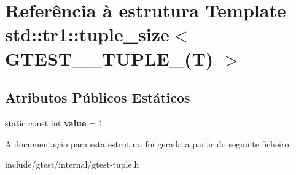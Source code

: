 \hypertarget{structstd_1_1tr1_1_1tuple__size_3_01GTEST__1__TUPLE___07T_08_01_4}{\section{Referência à estrutura Template std\-:\-:tr1\-:\-:tuple\-\_\-size$<$ G\-T\-E\-S\-T\-\_\-\_\-\-T\-U\-P\-L\-E\-\_\-(T) $>$}
\label{structstd_1_1tr1_1_1tuple__size_3_01GTEST__1__TUPLE___07T_08_01_4}
}
\subsection*{Atributos Públicos Estáticos}
\begin{DoxyCompactItemize}
\item 
\hypertarget{structstd_1_1tr1_1_1tuple__size_3_01GTEST__1__TUPLE___07T_08_01_4_a02cb0da1163ad7eb74782b8f63420d5a}{static const int {\bfseries value} = 1}\label{structstd_1_1tr1_1_1tuple__size_3_01GTEST__1__TUPLE___07T_08_01_4_a02cb0da1163ad7eb74782b8f63420d5a}

\end{DoxyCompactItemize}


A documentação para esta estrutura foi gerada a partir do seguinte ficheiro\-:\begin{DoxyCompactItemize}
\item 
include/gtest/internal/gtest-\/tuple.\-h\end{DoxyCompactItemize}

